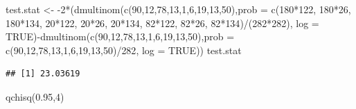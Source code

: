 \documentclass[
]{book}
\newenvironment{Shaded}{\begin{snugshade}}{\end{snugshade}}
\newcommand{\AttributeTok}[1]{\textcolor[rgb]{0.77,0.63,0.00}{#1}}
\newcommand{\ConstantTok}[1]{\textcolor[rgb]{0.00,0.00,0.00}{#1}}
\newcommand{\DecValTok}[1]{\textcolor[rgb]{0.00,0.00,0.81}{#1}}
\newcommand{\FloatTok}[1]{\textcolor[rgb]{0.00,0.00,0.81}{#1}}
\newcommand{\FunctionTok}[1]{\textcolor[rgb]{0.00,0.00,0.00}{#1}}
\newcommand{\NormalTok}[1]{#1}
\newcommand{\OtherTok}[1]{\textcolor[rgb]{0.56,0.35,0.01}{#1}}
\newcommand{\SpecialCharTok}[1]{\textcolor[rgb]{0.00,0.00,0.00}{#1}}
\begin{document}
\begin{Shaded}
\begin{Highlighting}[]
\NormalTok{test.stat }\OtherTok{\textless{}{-}} \SpecialCharTok{{-}}\DecValTok{2}\SpecialCharTok{*}\NormalTok{(}\FunctionTok{dmultinom}\NormalTok{(}\FunctionTok{c}\NormalTok{(}\DecValTok{90}\NormalTok{,}\DecValTok{12}\NormalTok{,}\DecValTok{78}\NormalTok{,}\DecValTok{13}\NormalTok{,}\DecValTok{1}\NormalTok{,}\DecValTok{6}\NormalTok{,}\DecValTok{19}\NormalTok{,}\DecValTok{13}\NormalTok{,}\DecValTok{50}\NormalTok{),}\AttributeTok{prob =} \FunctionTok{c}\NormalTok{(}\DecValTok{180}\SpecialCharTok{*}\DecValTok{122}\NormalTok{, }\DecValTok{180}\SpecialCharTok{*}\DecValTok{26}\NormalTok{, }\DecValTok{180}\SpecialCharTok{*}\DecValTok{134}\NormalTok{, }\DecValTok{20}\SpecialCharTok{*}\DecValTok{122}\NormalTok{, }\DecValTok{20}\SpecialCharTok{*}\DecValTok{26}\NormalTok{, }\DecValTok{20}\SpecialCharTok{*}\DecValTok{134}\NormalTok{, }\DecValTok{82}\SpecialCharTok{*}\DecValTok{122}\NormalTok{, }\DecValTok{82}\SpecialCharTok{*}\DecValTok{26}\NormalTok{, }\DecValTok{82}\SpecialCharTok{*}\DecValTok{134}\NormalTok{)}\SpecialCharTok{/}\NormalTok{(}\DecValTok{282}\SpecialCharTok{*}\DecValTok{282}\NormalTok{), }\AttributeTok{log =} \ConstantTok{TRUE}\NormalTok{)}\SpecialCharTok{{-}}\FunctionTok{dmultinom}\NormalTok{(}\FunctionTok{c}\NormalTok{(}\DecValTok{90}\NormalTok{,}\DecValTok{12}\NormalTok{,}\DecValTok{78}\NormalTok{,}\DecValTok{13}\NormalTok{,}\DecValTok{1}\NormalTok{,}\DecValTok{6}\NormalTok{,}\DecValTok{19}\NormalTok{,}\DecValTok{13}\NormalTok{,}\DecValTok{50}\NormalTok{),}\AttributeTok{prob =} \FunctionTok{c}\NormalTok{(}\DecValTok{90}\NormalTok{,}\DecValTok{12}\NormalTok{,}\DecValTok{78}\NormalTok{,}\DecValTok{13}\NormalTok{,}\DecValTok{1}\NormalTok{,}\DecValTok{6}\NormalTok{,}\DecValTok{19}\NormalTok{,}\DecValTok{13}\NormalTok{,}\DecValTok{50}\NormalTok{)}\SpecialCharTok{/}\DecValTok{282}\NormalTok{, }\AttributeTok{log =} \ConstantTok{TRUE}\NormalTok{))}
\NormalTok{test.stat}
\end{Highlighting}
\end{Shaded}

\begin{verbatim}
## [1] 23.03619
\end{verbatim}

\begin{Shaded}
\begin{Highlighting}[]
\FunctionTok{qchisq}\NormalTok{(}\FloatTok{0.95}\NormalTok{,}\DecValTok{4}\NormalTok{)}
\end{Highlighting}
\end{Shaded}
\end{document}
